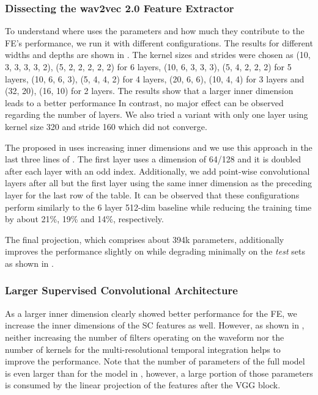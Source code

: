 \documentclass{INTERSPEECH2023}
\begin{document}
\subsubsection{Dissecting the wav2vec 2.0 Feature Extractor}
\label{sec:w2v_components}
To understand where \wvtwo uses the parameters and how much they contribute to the \gls{FE}'s performance, we run it with different configurations.
The results for different widths and depths are shown in .
The kernel sizes and strides were chosen as (10, 3, 3, 3, 3, 2), (5, 2, 2, 2, 2, 2) for 6 layers, (10, 6, 3, 3, 3), (5, 4, 2, 2, 2) for 5 layers, (10, 6, 6, 3), (5, 4, 4, 2) for 4 layers, (20, 6, 6), (10, 4, 4) for 3 layers and (32, 20), (16, 10) for 2 layers.
The results show that a larger inner dimension leads to a better performance
In contrast, no major effect can be observed regarding the number of layers.
We also tried a variant with only one layer using kernel size 320 and stride 160 which did not converge.

The proposed \fe in \cite{asapp2022performance} uses increasing inner dimensions and we use this approach in the last three lines of .
The first layer uses a dimension of 64/128 and it is doubled after each layer with an odd index.
Additionally, we add point-wise convolutional layers after all but the first layer using the same inner dimension as the preceding layer for the last row of the table.
It can be observed that these configurations perform similarly to the 6 layer 512-dim baseline while reducing the training time by about 21\%, 19\% and 14\%, respectively.

The final projection, which comprises about 394k parameters, additionally improves the performance slightly on \devother while degrading minimally on the \textit{test} sets as shown in .



\subsubsection{Larger Supervised Convolutional Architecture}
\label{sec:scf_size}
As a larger inner dimension clearly showed better performance for the \wvtwo \gls{FE}, we increase the inner dimensions of the \gls{SC} features as well.
However, as shown in , neither increasing the number of filters operating on the waveform nor the number of kernels for the multi-resolutional temporal integration helps to improve the performance.
Note that the number of parameters of the full model is even larger than for the \wvtwo model in , however, a large portion of those parameters is consumed by the linear projection of the features after the \gls{VGG} block.

\end{document}
